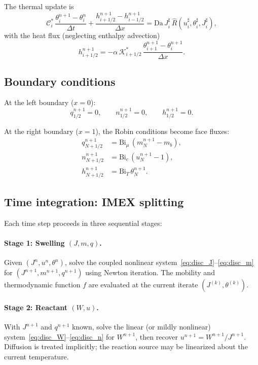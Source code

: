 \documentclass[aps,pre,reprint,superscriptaddress,longbibliography,floatfix]{revtex4-2}
\newcommand{\Cs}{\mathcal{C}}
\newcommand{\Ks}{\mathcal{K}}
\newcommand{\Da}{\mathrm{Da}}
\newcommand{\Bi}{\mathrm{Bi}}
\newcommand{\Rhat}{\widehat{R}}
\begin{document}
The thermal update is
\begin{equation}
  \Cs_i^{*}\,\frac{\theta_i^{n+1} - \theta_i^{n}}{\Delta t}
  + \frac{h_{i+1/2}^{n+1} - h_{i-1/2}^{n+1}}{\Delta x}
  = \Da\,J_i^{\sharp}\,\Rhat(u_i^{\sharp},\theta_i^{\sharp},J_i^{\sharp}),
  \label{eq:disc_theta}
\end{equation}
with the heat flux (neglecting enthalpy advection)
\begin{equation}
  h_{i+1/2}^{n+1}
  = -\alpha\,\Ks_{i+1/2}^{*}\,
  \frac{\theta_{i+1}^{n+1} - \theta_i^{n+1}}{\Delta x}.
  \label{eq:disc_h}
\end{equation}

\subsection{Boundary conditions}

At the left boundary ($x=0$):
\begin{equation}
  q_{1/2}^{n+1} = 0,
  \qquad
  n_{1/2}^{n+1} = 0,
  \qquad
  h_{1/2}^{n+1} = 0.
  \label{eq:disc_bc0}
\end{equation}

At the right boundary ($x=1$), the Robin conditions become face fluxes:
\begin{align}
  q_{N+1/2}^{n+1} &= \Bi_\mu\,(m_N^{n+1} - m_b), \label{eq:disc_bc1_q} \\
  n_{N+1/2}^{n+1} &= \Bi_c\,(u_N^{n+1} - 1), \label{eq:disc_bc1_n} \\
  h_{N+1/2}^{n+1} &= \Bi_T\,\theta_N^{n+1}. \label{eq:disc_bc1_h}
\end{align}

\subsection{Time integration: IMEX splitting}

Each time step proceeds in three sequential stages:

\paragraph{Stage 1: Swelling $(J,m,q)$.}
Given $(J^n, u^n, \theta^n)$, solve the coupled nonlinear system~\eqref{eq:disc_J}--\eqref{eq:disc_m} for $(J^{n+1}, m^{n+1}, q^{n+1})$ using Newton iteration. The mobility and thermodynamic function $f$ are evaluated at the current iterate $(J^{(k)},\theta^{(k)})$.

\paragraph{Stage 2: Reactant $(W,u)$.}
With $J^{n+1}$ and $q^{n+1}$ known, solve the linear (or mildly nonlinear) system~\eqref{eq:disc_W}--\eqref{eq:disc_n} for $W^{n+1}$, then recover $u^{n+1} = W^{n+1}/J^{n+1}$. Diffusion is treated implicitly; the reaction source may be linearized about the current temperature.
\end{document}
